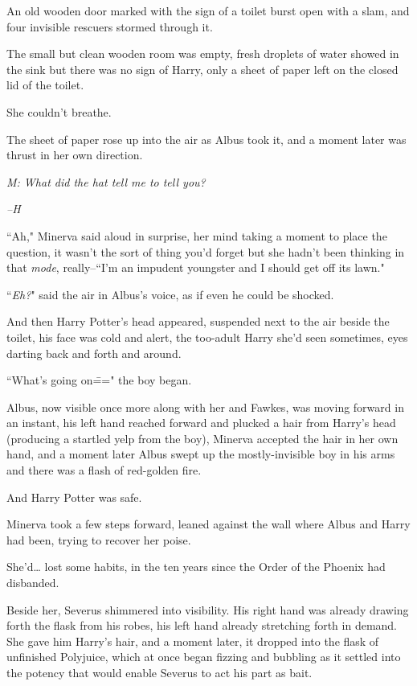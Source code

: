 An old wooden door marked with the sign of a toilet burst open with a slam, and four invisible rescuers stormed through it.

The small but clean wooden room was empty, fresh droplets of water showed in the sink but there was no sign of Harry, only a sheet of paper left on the closed lid of the toilet.

She couldn't breathe.

The sheet of paper rose up into the air as Albus took it, and a moment later was thrust in her own direction.

\emph{M: What did the hat tell me to tell you?}

\emph{\---H}

``Ah," Minerva said aloud in surprise, her mind taking a moment to place the question, it wasn't the sort of thing you'd forget but she hadn't been thinking in that \emph{mode}, really\---``I'm an impudent youngster and I should get off its lawn."

``\emph{Eh?}" said the air in Albus's voice, as if even he could be shocked.

And then Harry Potter's head appeared, suspended next to the air beside the toilet, his face was cold and alert, the too-adult Harry she'd seen sometimes, eyes darting back and forth and around.

``What's going on\===" the boy began.

Albus, now visible once more along with her and Fawkes, was moving forward in an instant, his left hand reached forward and plucked a hair from Harry's head (producing a startled yelp from the boy), Minerva accepted the hair in her own hand, and a moment later Albus swept up the mostly-invisible boy in his arms and there was a flash of red-golden fire.

And Harry Potter was safe.

Minerva took a few steps forward, leaned against the wall where Albus and Harry had been, trying to recover her poise.

She'd{\ldots} lost some habits, in the ten years since the Order of the Phoenix had disbanded.

Beside her, Severus shimmered into visibility. His right hand was already drawing forth the flask from his robes, his left hand already stretching forth in demand. She gave him Harry's hair, and a moment later, it dropped into the flask of unfinished Polyjuice, which at once began fizzing and bubbling as it settled into the potency that would enable Severus to act his part as bait.

